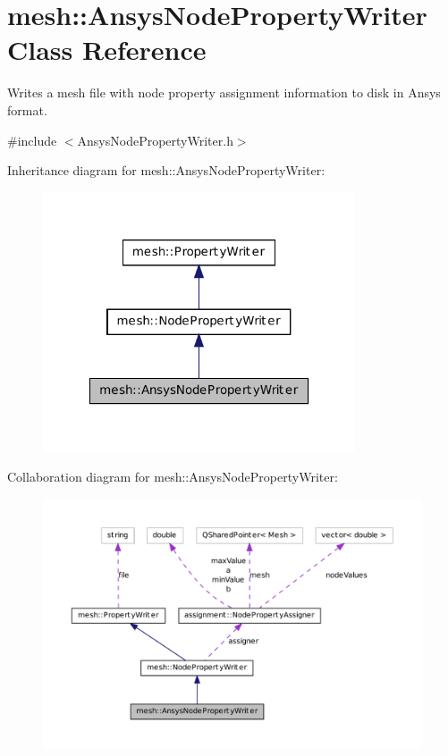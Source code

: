 \hypertarget{classmesh_1_1_ansys_node_property_writer}{
\section{mesh::AnsysNodePropertyWriter Class Reference}
\label{classmesh_1_1_ansys_node_property_writer}
}


Writes a mesh file with node property assignment information to disk in Ansys format.  




{\ttfamily \#include $<$AnsysNodePropertyWriter.h$>$}



Inheritance diagram for mesh::AnsysNodePropertyWriter:\nopagebreak
\begin{figure}[H]
\begin{center}
\leavevmode
\includegraphics[width=262pt]{classmesh_1_1_ansys_node_property_writer__inherit__graph}
\end{center}
\end{figure}


Collaboration diagram for mesh::AnsysNodePropertyWriter:\nopagebreak
\begin{figure}[H]
\begin{center}
\leavevmode
\includegraphics[width=400pt]{classmesh_1_1_ansys_node_property_writer__coll__graph}
\end{center}
\end{figure}

